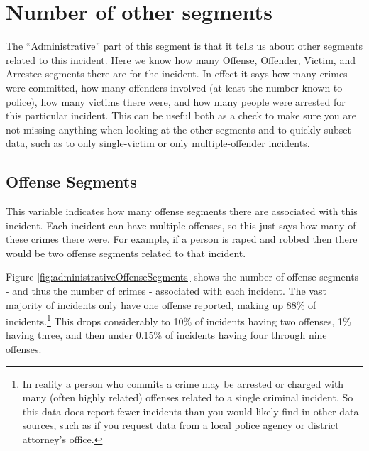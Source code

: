 \documentclass[
]{krantz}
\begin{document}
\section{Number of other
segments}\label{number-of-other-segments}

The ``Administrative'' part of this segment is that it tells
us about other segments related to this incident. Here we
know how many Offense, Offender, Victim, and Arrestee
segments there are for the incident. In effect it says how
many crimes were committed, how many offenders involved (at
least the number known to police), how many victims there
were, and how many people were arrested for this particular
incident. This can be useful both as a check to make sure
you are not missing anything when looking at the other
segments and to quickly subset data, such as to only
single-victim or only multiple-offender incidents.

\subsection{Offense Segments}\label{offense-segments}

This variable indicates how many offense segments there are
associated with this incident. Each incident can have
multiple offenses, so this just says how many of these
crimes there were. For example, if a person is raped and
robbed then there would be two offense segments related to
that incident.

Figure \ref{fig:administrativeOffenseSegments} shows the
number of offense segments - and thus the number of crimes -
associated with each incident. The vast majority of
incidents only have one offense reported, making up 88\% of
incidents.\footnote{In reality a person who commits a crime
  may be arrested or charged with many (often highly
  related) offenses related to a single criminal incident.
  So this data does report fewer incidents than you would
  likely find in other data sources, such as if you request
  data from a local police agency or district attorney's
  office.} This drops considerably to 10\% of incidents
having two offenses, 1\% having three, and then under 0.15\%
of incidents having four through nine offenses.
\end{document}
